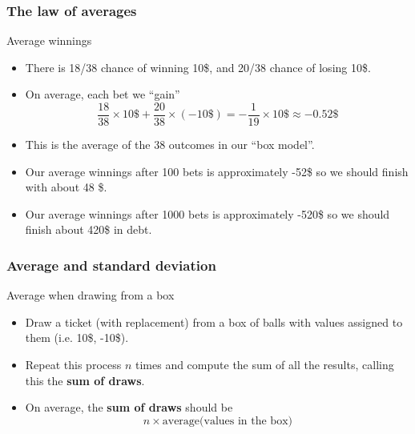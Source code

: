 \documentclass[handout]{beamer}
\begin{document}
   \begin{frame} \frametitle{The law of averages}

   \begin{block}
   {Average winnings}
   \begin{itemize}
   \item There is 18/38 chance of winning 10\$, and 20/38 chance of losing 10\$.
   \item On average, each bet we ``gain''
   $$
   \frac{18}{38} \times 10\$ + \frac{20}{38} \times (-10\$) = -\frac{1}{19} \times 10\$ \approx -0.52\$
   $$
   \item This is the average of the 38 outcomes in our ``box model''.
   \item Our average winnings after 100 bets is approximately -52\$ so
   we should finish with about 48 \$.
   \item Our average winnings after 1000 bets is approximately -520\$
   so we should finish about 420\$ in debt.
   \end{itemize}
   \end{block}
   \end{frame}


   \begin{frame} \frametitle{Average and standard deviation}

   \begin{block}
   {Average when drawing from a box}
   \begin{itemize}
   \item Draw a ticket (with replacement) from a box of balls with values
   assigned to them
   (i.e. 10\$, -10\$).
   \item Repeat this process $n$ times and compute the
   sum of all the results, calling this the {\bf sum of draws}.
   \item On average, the {\bf sum of draws} should be
   $$
   n \times \text{average(values in the box)}
   $$
   \end{itemize}
   \end{block}
   \end{frame}

\end{document}
